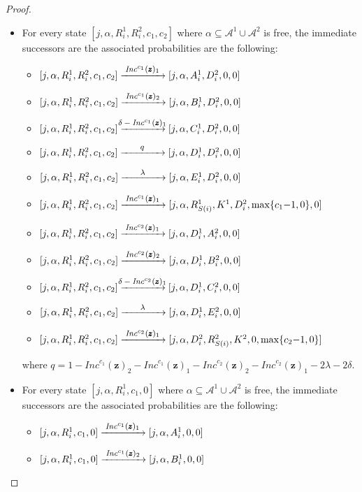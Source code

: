 \documentclass[a4paper,UKenglish,cleveref, autoref, thm-restate]{lipics-v2021}
\newcommand{\A}{\mathcal{A}}
\newcommand{\tran}[1]{\xrightarrow{\makebox[4em]{\footnotesize$#1$}}}
\newcommand{\INC}{\mathit{Inc}}
\renewcommand{\vec}[1]{\pmb{#1}}
\newcommand{\vv}[1]{\INC^{#1}(\vec{z})}
\begin{document}
\begin{proof}
\begin{itemize}
  \item For every state $[j,\alpha,R_i^1,R_i^2,c_1,c_2]$ where $\alpha \subseteq \A^1 \cup \A^2$ is free, the immediate successors are the associated probabilities are the following:
  \begin{itemize}
      \item $[j,\alpha,R_i^1,R_i^2,c_1,c_2] \tran{\vv{c_1}_1}
             [j,\alpha,A_i^1,D_i^2,0,0]$ 
      \item $[j,\alpha,R_i^1,R_i^2,c_1,c_2] \tran{\vv{c_1}_2}
             [j,\alpha,B_i^1,D_i^2,0,0]$ 
      \item $[j,\alpha,R_i^1,R_i^2,c_1,c_2] \tran{\delta - \vv{c_1}_1}
             [j,\alpha,C_i^1,D_i^2,0,0]$        
      \item $[j,\alpha,R_i^1,R_i^2,c_1,c_2] \tran{q}
             [j,\alpha,D_i^1,D_i^2,0,0]$ 
      \item $[j,\alpha,R_i^1,R_i^2,c_1,c_2] \tran{\lambda}
             [j,\alpha,E_i^1,D_i^2,0,0]$ 
      \item $[j,\alpha,R_i^1,R_i^2,c_1,c_2] \tran{\vv{c_1}_1}
             [j,\alpha,R_{S(i)}^1,K^1,D_i^2,\max\{c_1{-}1,0\},0]$ 
      \item $[j,\alpha,R_i^1,R_i^2,c_1,c_2] \tran{\vv{c_2}_1}
             [j,\alpha,D_i^1,A_i^2,0,0]$ 
      \item $[j,\alpha,R_i^1,R_i^2,c_1,c_2] \tran{\vv{c_2}_2}
             [j,\alpha,D_i^1,B_i^2,0,0]$ 
      \item $[j,\alpha,R_i^1,R_i^2,c_1,c_2] \tran{\delta - \vv{c_2}_1}
             [j,\alpha,D_i^1,C_i^2,0,0]$        
      \item $[j,\alpha,R_i^1,R_i^2,c_1,c_2] \tran{\lambda}
             [j,\alpha,D_i^1,E_i^2,0,0]$ 
      \item $[j,\alpha,R_i^1,R_i^2,c_1,c_2] \tran{\vv{c_2}_1}
             [j,\alpha,D_i^2,R_{S(i)}^2,K^2,0,\max\{c_2{-}1,0\}]$ 
\end{itemize}
  where $q = 1 - \vv{c_1}_2 -\vv{c_1}_1 - \vv{c_2}_2 - \vv{c_2}_1- 2\lambda - 2\delta$.
  \item For every state $[j,\alpha,R_i^1,c_1,0]$  where $\alpha \subseteq \A^1 \cup \A^2$ is free, the immediate successors are the associated probabilities are the following:
  \begin{itemize}
        \item $[j,\alpha,R_i^1,c_1,0] \tran{\vv{c_1}_1}
               [j,\alpha,A_i^1,0,0]$ 
        \item $[j,\alpha,R_i^1,c_1,0] \tran{\vv{c_1}_2}
               [j,\alpha,B_i^1,0,0]$ 

\end{itemize}
\end{itemize}
\end{proof}
\end{document}
